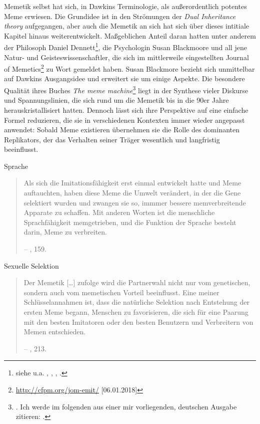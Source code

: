 \documentclass[openany,twoside,twocolumn]{book}
\let\rmarkdownfootnote\footnote%
\def\footnote{\protect\rmarkdownfootnote}
\begin{document}
Memetik selbst hat sich, in Dawkins Terminologie, als außerordentlich
potentes Meme erwiesen. Die Grundidee ist in den Strömungen der
\emph{Dual Inheritance theory} aufgegangen, aber auch die Memetik an
sich hat sich über dieses intitiale Kapitel hinaus weiterentwickelt.
Maßgeblichen Anteil daran hatten unter anderem der Philosoph Daniel
Dennett\footnote{siehe u.a. \textcite{dennett_brainstorms_1978},
  \textcite{dennett_elbow_1984}, \textcite{dennett_consciousness_1991},
  \textcite{dennett_darwins_1995}.}, die Psychologin Susan Blackmoore
und all jene Natur- und Geisteswissenschaftler, die sich im mittlerweile
eingestellten Journal of Memetics\footnote{\url{http://cfpm.org/jom-emit/}
  {[}06.01.2018{]}} zu Wort gemeldet haben. Susan Blackmore bezieht sich
unmittelbar auf Dawkins Ausgangsidee und erweitert sie um einige
Aspekte. Die besondere Qualität ihres Buches \emph{The meme
machine}\footnote{\textcite{blackmore_meme_1999}. Ich werde im folgenden
  aus einer mir vorliegenden, deutschen Ausgabe zitieren:
  \textcite{blackmore_macht_2000}.} liegt in der Synthese vieler
Diskurse und Spannungslinien, die sich rund um die Memetik bis in die
90er Jahre herauskristallisiert hatten. Dennoch lässt sich ihre
Perspektive auf eine einfache Formel reduzieren, die sie in
verschiedenen Kontexten immer wieder angepasst anwendet: Sobald Meme
existieren übernehmen sie die Rolle des dominanten Replikators, der das
Verhalten seiner Träger wesentlich und langfristig beeinflusst.

Sprache

\begin{quote}
Als sich die Imitationsfähigkeit erst einmal entwickelt hatte und Meme
auftauchten, haben diese Meme die Umwelt verändert, in der die Gene
selektiert wurden und zwangen sie so, immmer bessere memverbreitende
Apparate zu schaffen. Mit anderen Worten ist die menschliche
Sprachfähigkeit memgetrieben, und die Funktion der Sprache besteht
darin, Meme zu verbreiten.

-- \textcite{blackmore_macht_2000}, 159.
\end{quote}

Sexuelle Selektion

\begin{quote}
Der Memetik {[}\ldots{}{]} zufolge wird die Partnerwahl nicht nur vom
genetischen, sondern auch vom memetischen Vorteil beeinflusst. Eine
meiner Schlüsselannahmen ist, dass die natürliche Selektion nach
Entstehung der ersten Meme begann, Menschen zu favorisieren, die sich
für eine Paarung mit den besten Imitatoren oder den besten Benutzern und
Verbreitern von Memen entschieden.

-- \textcite{blackmore_macht_2000}, 213.
\end{quote}
\end{document}
